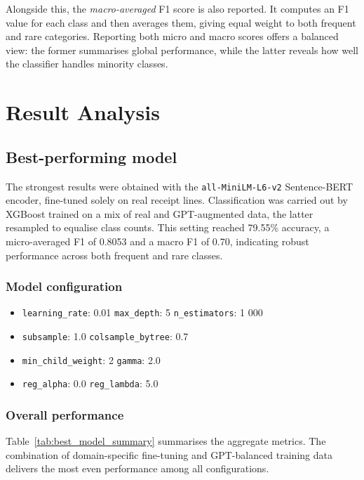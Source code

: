 \documentclass{SGGW-thesis-EN}
\begin{document}
Alongside this, the \emph{macro-averaged} F1 score is also reported. It computes an
F1 value for each class and then averages them, giving equal weight to both frequent and rare
categories. Reporting both micro and macro scores offers a balanced view: the former summarises global performance,
while the latter reveals how well the classifier handles minority classes.


\section{Result Analysis}
\subsection{Best-performing model}
The strongest results were obtained with the \texttt{all-MiniLM-L6-v2} Sentence-BERT encoder, fine-tuned solely on real
receipt lines.
Classification was carried out by XGBoost trained on a mix of real and GPT-augmented data, the latter resampled to
equalise class counts. This setting reached 79.55\% accuracy, a micro-averaged F1 of 0.8053 and a
macro F1 of 0.70, indicating robust performance across both frequent and rare classes.

\subsubsection*{Model configuration}
\begin{itemize}
  \item \texttt{learning\_rate}: 0.01 \quad \texttt{max\_depth}: 5 \quad \texttt{n\_estimators}: 1 000
  \item \texttt{subsample}: 1.0 \quad \texttt{colsample\_bytree}: 0.7
  \item \texttt{min\_child\_weight}: 2 \quad \texttt{gamma}: 2.0
  \item \texttt{reg\_alpha}: 0.0 \quad \texttt{reg\_lambda}: 5.0
\end{itemize}

\subsubsection*{Overall performance}
Table~\ref{tab:best_model_summary} summarises the aggregate metrics. The combination of domain-specific fine-tuning and
GPT-balanced training data delivers the most even performance among all configurations.
\end{document}
